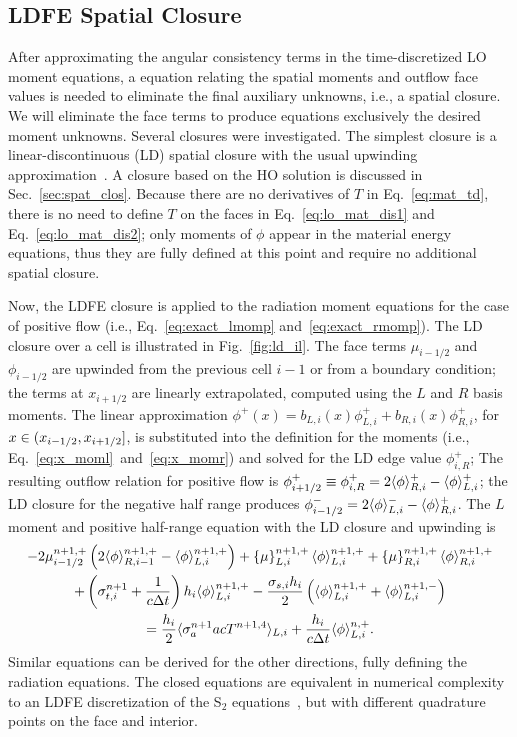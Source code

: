 \subsection{LDFE Spatial Closure}

After approximating the angular consistency terms in the time-discretized LO moment equations, 
a equation relating the spatial moments and outflow face values is
needed to eliminate the final auxiliary unknowns, i.e., a spatial closure.
We will eliminate the face terms to produce equations exclusively the desired moment
unknowns.  Several closures were investigated.  The simplest closure
is a linear-discontinuous (LD) spatial closure with the usual upwinding
approximation~\cite{morel_ldtrt}.  A closure based on the HO solution is discussed in
Sec.~\ref{sec:spat_clos}.  Because there are no derivatives of $T$ in Eq.~\eqref{eq:mat_td}, there is no need
to define $T$ on the faces in Eq.~\eqref{eq:lo_mat_dis1} and Eq.~\eqref{eq:lo_mat_dis2};
only moments of $\phi$ appear in the material energy
equations, thus they are fully defined at this point and require no additional spatial
closure.  

Now, the LDFE closure is applied to the radiation moment equations for the case of
positive flow (i.e., Eq.~\eqref{eq:exact_lmomp} and~\eqref{eq:exact_rmomp}). The LD closure over a cell
is illustrated in Fig.~\ref{fig:ld_il}.  The face terms $\mu_{i-1/2}$ and $\phi_{i-1/2}$
are upwinded from the previous cell $i-1$ or from a boundary condition; the terms
at $x_{i+1/2}$ are linearly extrapolated, computed using the $L$ and $R$ basis
moments.  The linear approximation $\phi^+(x)=b_{L,i}(x)\phi^+_{L,i} +
b_{R,i}(x)\phi^+_{R,i}$, for $x\in({x_{i-1/2}},{x_{i+1/2}}]$, is substituted into the definition for
the moments (i.e., Eq.~\eqref{eq:x_moml}~and~\eqref{eq:x_momr}) and solved for the LD edge value
$\phi_{i,R}^+$; The resulting outflow relation for positive flow is $\phi^+_{i+1/2} \equiv \phi_{i,R}^+ = 2\langle \phi \rangle_{R,i}^+ -
\langle \phi \rangle_{L,i}^+$; the LD closure for the negative half range produces $\phi^-_{i-1/2} = 2\langle \phi \rangle_{L,i}^- -
\langle \phi \rangle_{R,i}^+$. The $L$ moment and positive half-range equation with the LD closure and upwinding is
\begin{multline} 
    -2{\mu}_{i-1/2}^{n+1,+} \left(2\langle \phi \rangle_{R,i-1}^{n+1,+} -   \langle \phi \rangle_{L,i}^{n+1,+}      \right) + \left\{ \mu \right\}_{L,i}^{n+1,+}
  \langle \phi \rangle_{L,i}^{n+1,+}
  +  \left\{ \mu \right\}_{R,i}^{n+1,+}
  \langle \phi \rangle_{R,i}^{n+1,+}\\ +  \left(\sigma_{t,i}^{n+1}+\frac{1}{c \Delta t} \right) h_i 
  \langle \phi \rangle_{L,i}^{n+1,+} -  \frac{\sigma_{s,i} h_i}{2} \left( \langle \phi \rangle_{L,i}^{n+1,+} +
  \langle \phi \rangle_{L,i}^{n+1,-}\right)\\  = \frac{h_i}{2} \langle \sigma_a^{n+1} a c T^{n+1,4} \rangle_{L,i} +
  \frac{h_i}{c\Delta t}\langle \phi \rangle_{L,i}^{n,+}.
\end{multline}
Similar equations can be derived for the other directions, fully defining the radiation
equations.   The closed equations are equivalent in numerical complexity to an LDFE
discretization of the S$_2$ equations~\cite{morel_ldtrt,lewis}, but with different quadrature points on the face
and interior.

